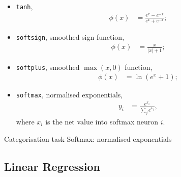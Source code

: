\begin{itemize}
    \item\texttt{tanh},
        \begin{align*}
            \phi(x) &= \frac{e^x - e^{-x}}{e^x + e^{-x}};
        \end{align*}

    \item\texttt{softsign}, smoothed sign function,
        \begin{align*}
            \phi(x) &= \frac{x}{|x| + 1};
        \end{align*}

    \item\texttt{softplus}, smoothed $\max(x,0)$ function,
        \begin{align*}
            \phi(x) &= \ln(e^x+1);
        \end{align*}

    \item\texttt{softmax}, normalised exponentials,
        \begin{align*}
            y_i &= \frac{e^{x_i}}{\sum_j e^{x_j}},
        \end{align*}
        where $x_i$ is the net value into softmax neuron $i$.
\end{itemize}

Categorisation task
Softmax: normalised exponentials




\subsection{Linear Regression}


